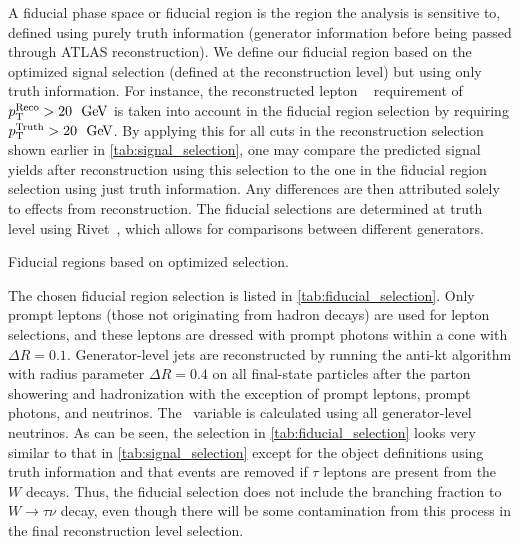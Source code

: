 A fiducial phase space or fiducial region is the 
region the analysis is sensitive to, defined 
using purely truth information (generator information before
being passed through ATLAS reconstruction).
We define our fiducial region
based on the optimized signal selection (defined at the reconstruction level)
but using only truth information. For instance, the reconstructed
lepton \pt~ requirement of 
$\pt^{\textrm{Reco}} > 20~\GeV$
is taken into account in the fiducial region selection
by requiring 
$\pt^{\textrm{Truth}} > 20~\GeV$.
By applying this for all cuts in the reconstruction selection
shown earlier in \tab\ref{tab:signal_selection},
one may compare the predicted signal yields after reconstruction
using this selection to the one in the fiducial region selection
using just truth information. Any differences are then attributed solely
to effects from reconstruction. 
The fiducial selections are determined at truth level 
using Rivet~\cite{Buckley:2010ar}, which allows for 
comparisons between different generators.


\begin{table}[ht!]
\centering
\begin{small}

\end{small}
\caption{Fiducial regions based on optimized selection.}
\label{tab:fiducial_selection}
\end{table}

The chosen fiducial region selection 
is listed in \tab\ref{tab:fiducial_selection}.
Only prompt leptons (those not originating from hadron decays) are used for 
lepton selections, and these leptons are dressed with prompt photons 
within a cone with $\Delta R = 0.1$. Generator-level jets are 
reconstructed by running the anti-kt algorithm with radius 
parameter $\Delta R = 0.4$ on all final-state particles 
after the parton showering and hadronization with the exception of prompt 
leptons, prompt photons, and neutrinos. The \MET~variable is calculated 
using all generator-level neutrinos. 
As can be seen, the selection 
in \tab\ref{tab:fiducial_selection} looks very similar to that in 
\tab\ref{tab:signal_selection} except for the object definitions
using truth information and that 
events are removed if $\tau$ leptons are present from the $W$ decays.  
Thus, the fiducial selection
does not include the branching fraction to $W\rightarrow\tau\nu$ decay, 
even though there will be some contamination from this process in the final 
reconstruction level selection. 



